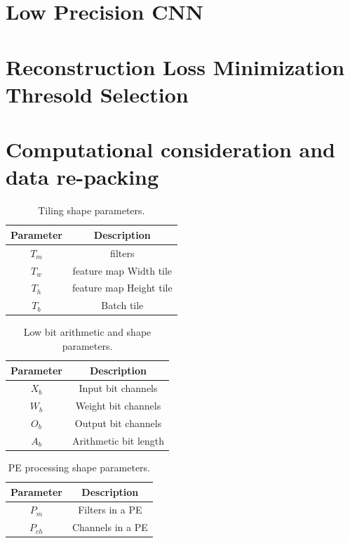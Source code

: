  
\section{Low Precision CNN}
\section{Reconstruction Loss Minimization Thresold Selection}
\section{Computational consideration and data re-packing}

\begin{table}
    \caption{Tiling shape parameters.}
    \label{tab:tile_shape}
    \centering
    \footnotesize 
        \begin{tabular}{cc}
        \toprule
        Parameter & Description \\
        \midrule
            $T_m$ & filters\\
            $T_w$ & feature map Width tile\\
            $T_h$ & feature map Height tile\\
            $T_b$ & Batch tile\\
        \bottomrule
        \end{tabular}
\end{table}

\begin{table}
    \caption{Low bit arithmetic and shape parameters.}
    \label{tab:bit_shape}
    \centering
    \footnotesize 
        \begin{tabular}{cc}
        \toprule
        Parameter & Description \\
        \midrule
        $X_b$ & Input bit channels\\
        $W_b$ & Weight bit channels\\
        $O_b$ & Output bit channels\\
        $A_b$ & Arithmetic bit length\\
        \bottomrule
        \end{tabular}
\end{table}
\begin{table}
    \caption{PE processing shape parameters.}
    \label{tab:pe_shape}
    \centering
    \footnotesize 
        \begin{tabular}{cc}
        \toprule
        Parameter & Description \\
        \midrule
        $P_m$ & Filters in a PE\\
        $P_{ch}$ & Channels in a PE\\
        \bottomrule
        \end{tabular}
\end{table}